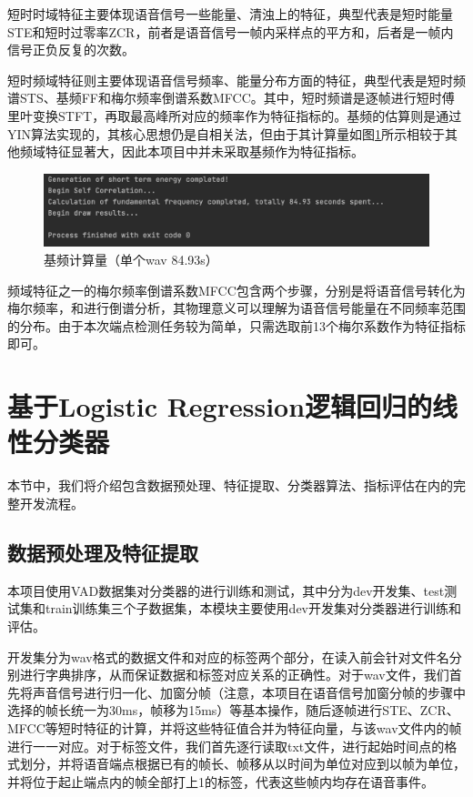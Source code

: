 \documentclass[a4paper]{article}
\begin{document}
短时时域特征主要体现语音信号一些能量、清浊上的特征，典型代表是短时能量STE和短时过零率ZCR，前者是语音信号一帧内采样点的平方和，后者是一帧内信号正负反复的次数。

短时频域特征则主要体现语音信号频率、能量分布方面的特征，典型代表是短时频谱STS、基频FF和梅尔频率倒谱系数MFCC。其中，短时频谱是逐帧进行短时傅里叶变换STFT，再取最高峰所对应的频率作为特征指标的。基频的估算则是通过YIN算法实现的，其核心思想仍是自相关法，但由于其计算量如图\ref{fig:1}所示相较于其他频域特征显著大，因此本项目中并未采取基频作为特征指标。

\begin{figure}[htb]
  \centering
  \includegraphics[scale=0.3]{figs/fundamental_frequency_1.png}
  \caption{基频计算量（单个wav 84.93s）}
  \label{fig:1}
\end{figure}

频域特征之一的梅尔频率倒谱系数MFCC包含两个步骤，分别是将语音信号转化为梅尔频率，和进行倒谱分析，其物理意义可以理解为语音信号能量在不同频率范围的分布。由于本次端点检测任务较为简单，只需选取前13个梅尔系数作为特征指标即可。

\section{基于Logistic Regression逻辑回归的线性分类器}

本节中，我们将介绍包含数据预处理、特征提取、分类器算法、指标评估在内的完整开发流程。

\subsection{数据预处理及特征提取}

本项目使用VAD数据集对分类器的进行训练和测试，其中分为dev开发集、test测试集和train训练集三个子数据集，本模块主要使用dev开发集对分类器进行训练和评估。

开发集分为wav格式的数据文件和对应的标签两个部分，在读入前会针对文件名分别进行字典排序，从而保证数据和标签对应关系的正确性。对于wav文件，我们首先将声音信号进行归一化、加窗分帧（注意，本项目在语音信号加窗分帧的步骤中选择的帧长统一为30ms，帧移为15ms）等基本操作，随后逐帧进行STE、ZCR、MFCC等短时特征的计算，并将这些特征值合并为特征向量，与该wav文件内的帧进行一一对应。对于标签文件，我们首先逐行读取txt文件，进行起始时间点的格式划分，并将语音端点根据已有的帧长、帧移从以时间为单位对应到以帧为单位，并将位于起止端点内的帧全部打上1的标签，代表这些帧内均存在语音事件。
\end{document}
